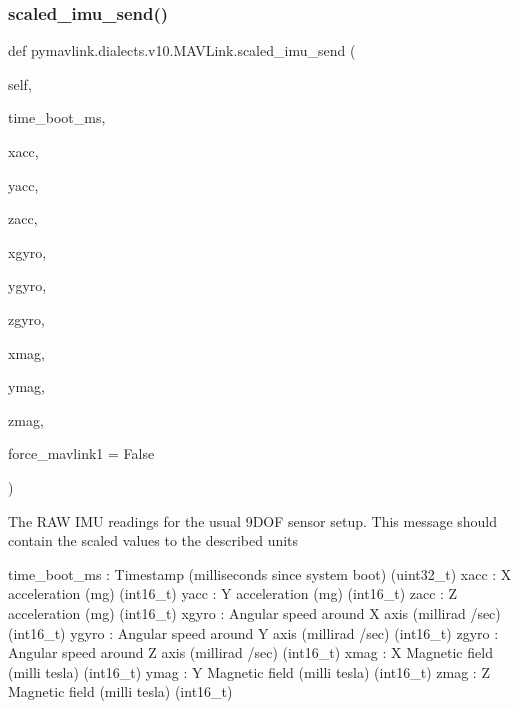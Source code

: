 \begin{DoxyVerb}
\begin{DoxyVerb}
\begin{DoxyVerb}
\begin{DoxyVerb}
\begin{DoxyVerb}
\begin{DoxyVerb}
\begin{DoxyVerb}
\begin{DoxyVerb}
\begin{DoxyVerb}
\begin{DoxyVerb}
\subsubsection{\texorpdfstring{scaled\+\_\+imu\+\_\+send()}{scaled\_imu\_send()}}
{\footnotesize\ttfamily def pymavlink.\+dialects.\+v10.\+M\+A\+V\+Link.\+scaled\+\_\+imu\+\_\+send (\begin{DoxyParamCaption}\item[{}]{self,  }\item[{}]{time\+\_\+boot\+\_\+ms,  }\item[{}]{xacc,  }\item[{}]{yacc,  }\item[{}]{zacc,  }\item[{}]{xgyro,  }\item[{}]{ygyro,  }\item[{}]{zgyro,  }\item[{}]{xmag,  }\item[{}]{ymag,  }\item[{}]{zmag,  }\item[{}]{force\+\_\+mavlink1 = {\ttfamily False} }\end{DoxyParamCaption})}

\begin{DoxyVerb}The RAW IMU readings for the usual 9DOF sensor setup. This message
should contain the scaled values to the described
units

time_boot_ms              : Timestamp (milliseconds since system boot) (uint32_t)
xacc                      : X acceleration (mg) (int16_t)
yacc                      : Y acceleration (mg) (int16_t)
zacc                      : Z acceleration (mg) (int16_t)
xgyro                     : Angular speed around X axis (millirad /sec) (int16_t)
ygyro                     : Angular speed around Y axis (millirad /sec) (int16_t)
zgyro                     : Angular speed around Z axis (millirad /sec) (int16_t)
xmag                      : X Magnetic field (milli tesla) (int16_t)
ymag                      : Y Magnetic field (milli tesla) (int16_t)
zmag                      : Z Magnetic field (milli tesla) (int16_t)\end{DoxyVerb}
 \mbox{\label{classpymavlink_1_1dialects_1_1v10_1_1MAVLink_aefc9175e3276d521bae57dce4efe91c0}} 

\end{DoxyVerb}
\end{DoxyVerb}
\end{DoxyVerb}
\end{DoxyVerb}
\end{DoxyVerb}
\end{DoxyVerb}
\end{DoxyVerb}
\end{DoxyVerb}
\end{DoxyVerb}
\end{DoxyVerb}
